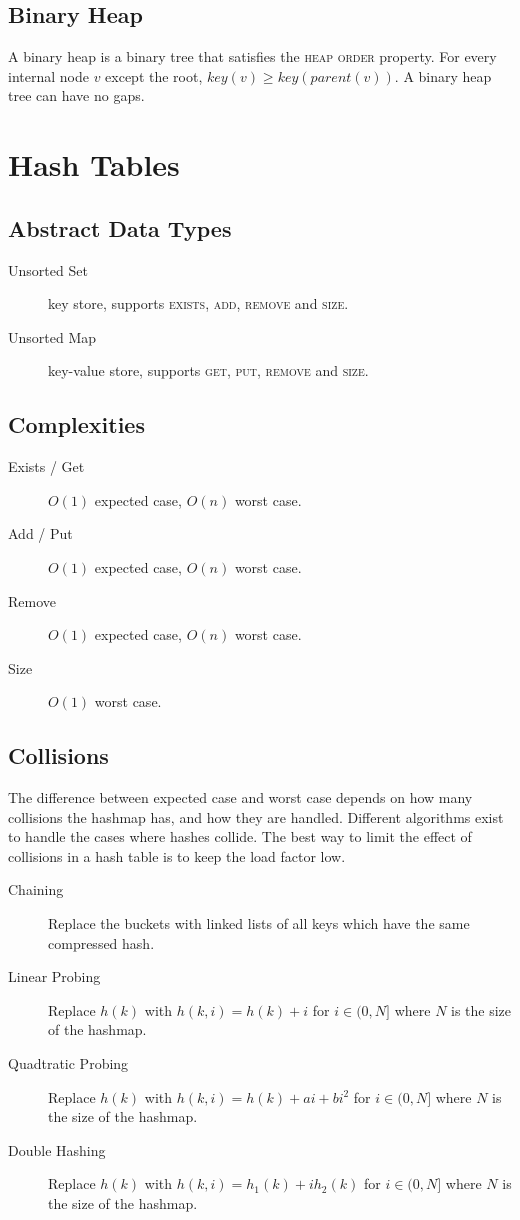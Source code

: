 \documentclass[landscape]{cheat}
\begin{document}
\begin{multicols}{3}
\subsection{Binary Heap}
A binary heap is a binary tree that satisfies the \textsc{heap order} property.
For every internal node $v$ except the root, $key(v) \geq key(parent(v))$.
A binary heap tree can have no gaps.

\section{Hash Tables}

\subsection{Abstract Data Types}
\begin{description}
    \item[Unsorted Set] key store,
        supports \textsc{exists}, \textsc{add}, \textsc{remove} and \textsc{size}.
    \item[Unsorted Map] key-value store,
        supports \textsc{get}, \textsc{put}, \textsc{remove} and \textsc{size}.
\end{description}

\subsection{Complexities}
\begin{description}
    \item[Exists / Get] $O(1)$ expected case, $O(n)$ worst case.
    \item[Add / Put] $O(1)$ expected case, $O(n)$ worst case.
    \item[Remove] $O(1)$ expected case, $O(n)$ worst case.
    \item[Size] $O(1)$ worst case.
\end{description}

\subsection{Collisions}
The difference between expected case and worst case depends on how many collisions the hashmap has, and how they are handled.
Different algorithms exist to handle the cases where hashes collide.
The best way to limit the effect of collisions in a hash table is to keep the load factor low.
\begin{description}
    \item[Chaining] Replace the buckets with linked lists of all keys which have the same compressed hash.
    \item[Linear Probing] Replace $h(k)$ with $h(k, i) = h(k) + i$ for $i \in (0,N]$ where $N$ is the size of the hashmap.
    \item[Quadtratic Probing] Replace $h(k)$ with $h(k, i) = h(k) + ai + bi^2$ for $i \in (0,N]$ where $N$ is the size of the hashmap.
    \item[Double Hashing] Replace $h(k)$ with $h(k, i) = h_1(k) + ih_2(k)$ for $i \in (0,N]$ where $N$ is the size of the hashmap.
\end{description}


\end{multicols}
\end{document}
